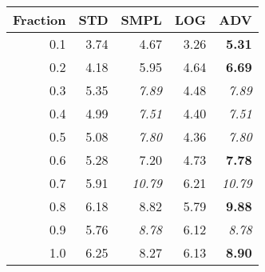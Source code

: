 \documentclass{standalone}
\begin{document}
\begin{tabular}{r|rrrr}
      \toprule
      Fraction & STD & SMPL & LOG & ADV\\
      \midrule
      0.1 & 3.74 & 4.67 & 3.26 & \textbf{5.31}\\
  0.2 & 4.18 & 5.95 & 4.64 & \textbf{6.69}\\
  0.3 & 5.35 & \emph{7.89} & 4.48 & \emph{7.89}\\
  0.4 & 4.99 & \emph{7.51} & 4.40 & \emph{7.51}\\
  0.5 & 5.08 & \emph{7.80} & 4.36 & \emph{7.80}\\
  0.6 & 5.28 & 7.20 & 4.73 & \textbf{7.78}\\
  0.7 & 5.91 & \emph{10.79} & 6.21 & \emph{10.79}\\
  0.8 & 6.18 & 8.82 & 5.79 & \textbf{9.88}\\
  0.9 & 5.76 & \emph{8.78} & 6.12 & \emph{8.78}\\
  1.0 & 6.25 & 8.27 & 6.13 & \textbf{8.90}\\
  \bottomrule
\end{tabular}
\end{document}
